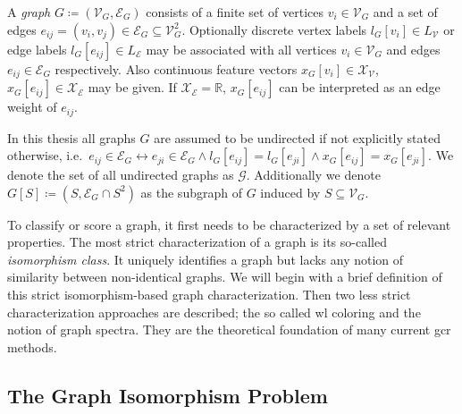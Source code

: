 \begin{defn}\label{defn:related:graph}
	A \textit{graph} $G \coloneqq (\mathcal{V}_G, \mathcal{E}_G)$ consists of a finite set of vertices $v_i \in \mathcal{V}_G$ and a set of edges $e_{ij} = (v_i, v_j) \in \mathcal{E}_G \subseteq \mathcal{V}_G^2$.
	Optionally discrete vertex labels $l_G[v_i] \in L_{\mathcal{V}}$ or edge labels $l_G[e_{ij}] \in L_{\mathcal{E}}$ may be associated with all vertices $v_i \in \mathcal{V}_G$ and edges $e_{ij}\in \mathcal{E}_G$ respectively.
	Also continuous feature vectors $x_G[v_{i}] \in \mathcal{X}_{\mathcal{V}}$, $x_G[e_{ij}] \in \mathcal{X}_{\mathcal{E}}$ may be given.
	If $\mathcal{X}_{\mathcal{E}} = \mathbb{R}$, $x_G[e_{ij}]$ can be interpreted as an edge weight of $e_{ij}$.

	In this thesis all graphs $G$ are assumed to be undirected if not explicitly stated otherwise, i.e.\ ${e_{ij} \in \mathcal{E}_G} \leftrightarrow\allowbreak {e_{ji} \in \mathcal{E}_G} \allowbreak\land l_G[e_{ij}] = l_G[e_{ji}] \allowbreak\land x_G[e_{ij}] = x_G[e_{ji}]$.
	We denote the set of all undirected graphs as $\mathcal{G}$.
	Additionally we denote $G[S] \coloneqq (S, \mathcal{E}_G \cap S^2)$ as the subgraph of $G$ induced by $S \subseteq \mathcal{V}_G$.
\end{defn}
To classify or score a graph, it first needs to be characterized by a set of relevant properties.
The most strict characterization of a graph is its so-called \textit{isomorphism class}.
It uniquely identifies a graph but lacks any notion of similarity between non-identical graphs.
We will begin with a brief definition of this strict isomorphism-based graph characterization.
Then two less strict characterization approaches are described; the so called \acl{wl} coloring and the notion of graph spectra.
They are the theoretical foundation of many current \ac{gcr} methods.

\subsection{The Graph Isomorphism Problem}%
\label{sec:related:character:iso}

